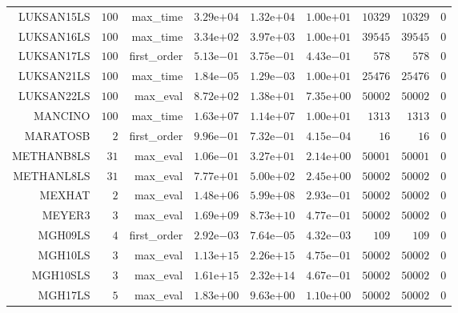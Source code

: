 \begin{longtable}{rrrrrrrrr}
LUKSAN15LS & \(   100\) & max\_time & \( 3.29\)e\(+04\) & \( 1.32\)e\(+04\) & \( 1.00\)e\(+01\) & \( 10329\) & \( 10329\) & \(     0\) \\
LUKSAN16LS & \(   100\) & max\_time & \( 3.34\)e\(+02\) & \( 3.97\)e\(+03\) & \( 1.00\)e\(+01\) & \( 39545\) & \( 39545\) & \(     0\) \\
LUKSAN17LS & \(   100\) & first\_order & \( 5.13\)e\(-01\) & \( 3.75\)e\(-01\) & \( 4.43\)e\(-01\) & \(   578\) & \(   578\) & \(     0\) \\
LUKSAN21LS & \(   100\) & max\_time & \( 1.84\)e\(-05\) & \( 1.29\)e\(-03\) & \( 1.00\)e\(+01\) & \( 25476\) & \( 25476\) & \(     0\) \\
LUKSAN22LS & \(   100\) & max\_eval & \( 8.72\)e\(+02\) & \( 1.38\)e\(+01\) & \( 7.35\)e\(+00\) & \( 50002\) & \( 50002\) & \(     0\) \\
MANCINO & \(   100\) & max\_time & \( 1.63\)e\(+07\) & \( 1.14\)e\(+07\) & \( 1.00\)e\(+01\) & \(  1313\) & \(  1313\) & \(     0\) \\
MARATOSB & \(     2\) & first\_order & \( 9.96\)e\(-01\) & \( 7.32\)e\(-01\) & \( 4.15\)e\(-04\) & \(    16\) & \(    16\) & \(     0\) \\
METHANB8LS & \(    31\) & max\_eval & \( 1.06\)e\(-01\) & \( 3.27\)e\(+01\) & \( 2.14\)e\(+00\) & \( 50001\) & \( 50001\) & \(     0\) \\
METHANL8LS & \(    31\) & max\_eval & \( 7.77\)e\(+01\) & \( 5.00\)e\(+02\) & \( 2.45\)e\(+00\) & \( 50002\) & \( 50002\) & \(     0\) \\
MEXHAT & \(     2\) & max\_eval & \( 1.48\)e\(+06\) & \( 5.99\)e\(+08\) & \( 2.93\)e\(-01\) & \( 50002\) & \( 50002\) & \(     0\) \\
MEYER3 & \(     3\) & max\_eval & \( 1.69\)e\(+09\) & \( 8.73\)e\(+10\) & \( 4.77\)e\(-01\) & \( 50002\) & \( 50002\) & \(     0\) \\
MGH09LS & \(     4\) & first\_order & \( 2.92\)e\(-03\) & \( 7.64\)e\(-05\) & \( 4.32\)e\(-03\) & \(   109\) & \(   109\) & \(     0\) \\
MGH10LS & \(     3\) & max\_eval & \( 1.13\)e\(+15\) & \( 2.26\)e\(+15\) & \( 4.75\)e\(-01\) & \( 50002\) & \( 50002\) & \(     0\) \\
MGH10SLS & \(     3\) & max\_eval & \( 1.61\)e\(+15\) & \( 2.32\)e\(+14\) & \( 4.67\)e\(-01\) & \( 50002\) & \( 50002\) & \(     0\) \\
MGH17LS & \(     5\) & max\_eval & \( 1.83\)e\(+00\) & \( 9.63\)e\(+00\) & \( 1.10\)e\(+00\) & \( 50002\) & \( 50002\) & \(     0\) \\

\end{longtable}
